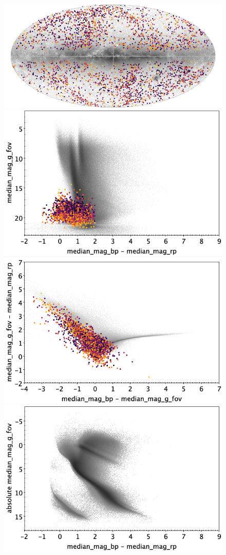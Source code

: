 \documentclass[longauth]{aa}
\begin{document}
\begin{appendix}
\begin{figure}
\centering
{}
\includegraphics[width=0.6\hsize]{figures/appendix/SN_cls_sky.png} 
 \\ %
\vspace{4mm}
 \includegraphics[width=0.45\hsize]{figures/appendix/SN_cls_cm.png}  %
\hspace{2mm}
 \includegraphics[width=0.45\hsize]{figures/appendix/SN_cls_cc.png} \\ %
\vspace{4mm}
 \includegraphics[width=0.45\hsize]{figures/appendix/SN_cls_cam.png}  %

\end{figure}
\end{appendix}
\end{document}

